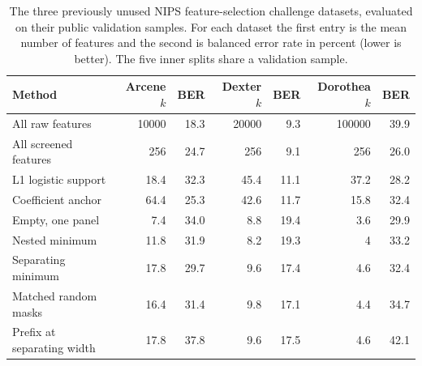 \begin{table}[tb]
\centering
\caption{The three previously unused NIPS feature-selection challenge datasets, evaluated on their public validation samples. For each dataset the first entry is the mean number of features and the second is balanced error rate in percent (lower is better). The five inner splits share a validation sample.}
\label{tab:challenge}
\small
\begin{tabular}{@{}lrrrrrr@{}}
\toprule
Method & Arcene $k$ & BER & Dexter $k$ & BER & Dorothea $k$ & BER \\
\midrule
All raw features & 10000 & 18.3 & 20000 & 9.3 & 100000 & 39.9 \\
All screened features & 256 & 24.7 & 256 & 9.1 & 256 & 26.0 \\
L1 logistic support & 18.4 & 32.3 & 45.4 & 11.1 & 37.2 & 28.2 \\
Coefficient anchor & 64.4 & 25.3 & 42.6 & 11.7 & 15.8 & 32.4 \\
Empty, one panel & 7.4 & 34.0 & 8.8 & 19.4 & 3.6 & 29.9 \\
Nested minimum & 11.8 & 31.9 & 8.2 & 19.3 & 4 & 33.2 \\
Separating minimum & 17.8 & 29.7 & 9.6 & 17.4 & 4.6 & 32.4 \\
Matched random masks & 16.4 & 31.4 & 9.8 & 17.1 & 4.4 & 34.7 \\
Prefix at separating width & 17.8 & 37.8 & 9.6 & 17.5 & 4.6 & 42.1 \\
\bottomrule
\end{tabular}
\end{table}
